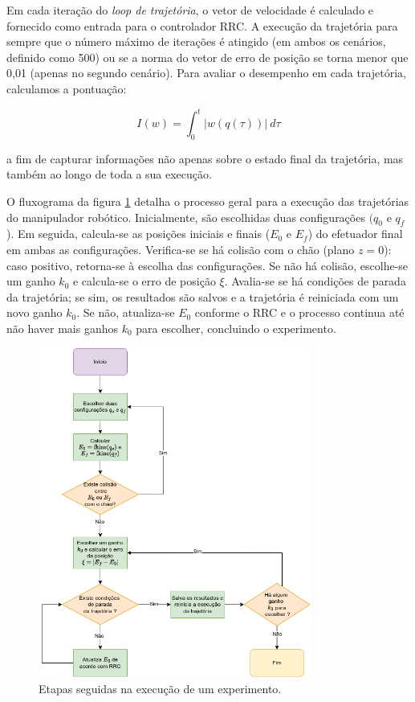 Em cada iteração do \emph{loop de trajetória}, o vetor de velocidade é calculado e 
fornecido como entrada para o controlador RRC. A execução da trajetória para sempre 
que o número máximo de iterações é atingido (em ambos os cenários, definido como 500) ou 
se a norma do vetor de erro de posição se torna menor que 0,01 (apenas no segundo cenário). 
Para avaliar o desempenho em cada trajetória, calculamos a pontuação:

\begin{equation}
	I(w) = \int_0^t {|w(q(\tau))| \ d\tau}
\end{equation}
	
a fim de capturar informações não apenas sobre o estado final da trajetória, mas também ao 
longo de toda a sua execução.

O fluxograma da figura \ref*{fig:exp-flow} detalha o processo geral para a execução das 
trajetórias do manipulador robótico. Inicialmente, são escolhidas duas configurações 
\((q_0\) e \(q_f\)). Em seguida, calcula-se as posições iniciais e finais (\(E_0\) e 
\(E_f\)) do efetuador final em ambas as configurações. Verifica-se se há colisão com 
o chão (plano $z=0$): caso positivo, retorna-se à escolha das configurações. Se não há 
colisão, escolhe-se um ganho \(k_0\) e calcula-se o erro de posição \(\xi\). Avalia-se 
se há condições de parada da trajetória; se sim, os resultados são salvos e a trajetória 
é reiniciada com um novo ganho \(k_0\). Se não, atualiza-se \(E_0\) conforme o RRC
e o processo continua até não haver mais ganhos \(k_0\) para escolher, concluindo o 
experimento.

\begin{figure}
	\centering
	\includegraphics[width=0.8\textwidth]{./Images/exp-flow.png}
	\caption{Etapas seguidas na execução de um experimento.}\label{fig:exp-flow}
\end{figure}

